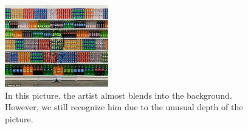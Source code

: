 \documentclass[conference]{IEEEtran}
\begin{document}
\begin{figure}[h]
	\centering
	\includegraphics[width=0.4\textwidth]{camo3}
	\caption{In this picture, the artist almost blends into the background. However, we still recognize him due to the unusual depth of the picture.}\label{fig:camouflage}
\end{figure}













%
%
%



\end{document}

